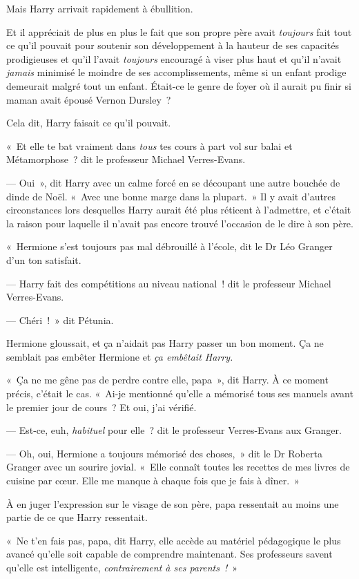 Mais Harry arrivait rapidement à ébullition.

Et il appréciait de plus en plus le fait que son propre père avait \emph{toujours} fait tout ce qu'il pouvait pour soutenir son développement à la hauteur de ses capacités prodigieuses et qu'il l'avait \emph{toujours} encouragé à viser plus haut et qu'il n'avait \emph{jamais} minimisé le moindre de ses accomplissements, même si un enfant prodige demeurait malgré tout un enfant.
Était-ce le genre de foyer où il aurait pu finir si maman avait épousé Vernon Dursley~?

Cela dit, Harry faisait ce qu'il pouvait.

«~Et elle te bat vraiment dans \emph{tous} tes cours à part vol sur balai et Métamorphose~? dit le professeur Michael Verres-Evans.

--- Oui~», dit Harry avec un calme forcé en se découpant une autre bouchée de dinde de Noël.
«~Avec une bonne marge dans la plupart.~»
Il y avait d'autres circonstances lors desquelles Harry aurait été plus réticent à l'admettre, et c'était la raison pour laquelle il n'avait pas encore trouvé l'occasion de le dire à son père.

«~Hermione s'est toujours pas mal débrouillé à l'école, dit le Dr Léo Granger d'un ton satisfait.

--- Harry fait des compétitions au niveau national~! dit le professeur Michael Verres-Evans.

--- Chéri~!~»
dit Pétunia.

Hermione gloussait, et ça n'aidait pas Harry passer un bon moment.
Ça ne semblait pas embêter Hermione et \emph{ça embêtait Harry.}

«~Ça ne me gêne pas de perdre contre elle, papa~», dit Harry.
À ce moment précis, c'était le cas.
«~Ai-je mentionné qu'elle a mémorisé tous ses manuels avant le premier jour de cours~?
Et oui, j'ai vérifié.

--- Est-ce, euh, \emph{habituel} pour elle~? dit le professeur Verres-Evans aux Granger.

--- Oh, oui, Hermione a toujours mémorisé des choses,~» dit le Dr Roberta Granger avec un sourire jovial.
«~Elle connaît toutes les recettes de mes livres de cuisine par cœur.
Elle me manque à chaque fois que je fais à dîner.~»

À en juger l'expression sur le visage de son père, papa ressentait au moins une partie de ce que Harry ressentait.

«~Ne t'en fais pas, papa, dit Harry, elle accède au matériel pédagogique le plus avancé qu'elle soit capable de comprendre maintenant.
Ses professeurs savent qu'elle est intelligente, \emph{contrairement à ses parents~!}~»

